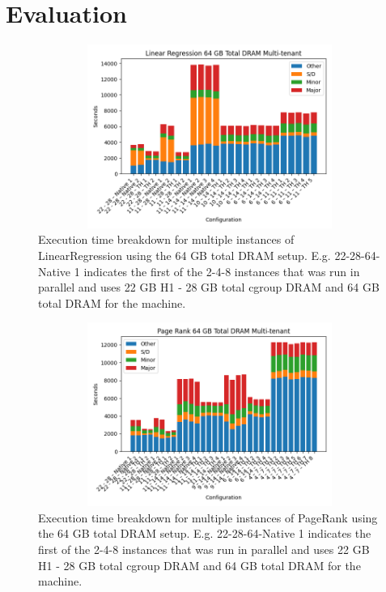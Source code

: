 \section{Evaluation}
\label{sec:eval}

\begin{figure}[ht!]
	\includegraphics[width=13cm,height=6cm]{./fig/linr64.png}
    \caption{Execution time breakdown for multiple instances of
    LinearRegression using the 64 GB total DRAM setup. E.g.
    22-28-64-Native 1 indicates the first of the 2-4-8 instances that
    was run in parallel and uses 22 GB H1 - 28 GB total cgroup DRAM
    and 64 GB total DRAM for the machine.}
	\label{fig:linr64}
\end{figure}

\begin{figure}[ht!]
        \includegraphics[width=13cm,height=6cm]{./fig/pr64.png}
    \caption{Execution time breakdown for multiple instances of
    PageRank using the 64 GB total DRAM setup. E.g. 22-28-64-Native 1
    indicates the first of the 2-4-8 instances that was run in
    parallel and uses 22 GB H1 - 28 GB total cgroup DRAM and 64 GB
    total DRAM for the machine.}
	\label{fig:pr64}
\end{figure}

